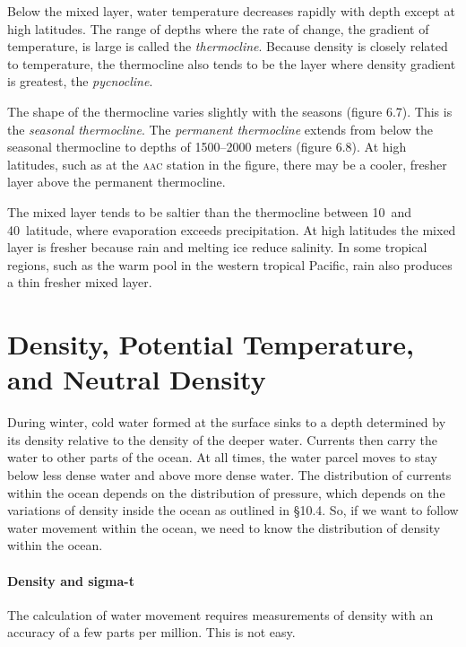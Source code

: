 Below the mixed layer, water temperature decreases rapidly with
depth except at high latitudes. The range of depths where the rate of change, the gradient of
temperature, is large is called the
\textit{thermocline}. Because density is closely related
to temperature, the thermocline also tends to be the layer where density gradient is greatest,
the \textit{pycnocline}.

The shape of the thermocline varies slightly with the seasons (figure 6.7). This is the \textit{seasonal
thermocline}.
 The \textit{permanent thermocline}
extends from below the seasonal thermocline to
depths of 1500--2000 meters (figure 6.8). At high latitudes, such as at the
\textsc{aac} station in the figure, there may be a cooler, fresher layer above the
permanent thermocline.

The mixed layer tends to be saltier than the thermocline between
10\degrees\ and 40\degrees\ latitude, where evaporation exceeds precipitation. At high
latitudes the mixed layer is fresher because rain and melting
ice reduce salinity. In some tropical regions, such as the warm pool in the western tropical
Pacific, rain also produces a thin fresher mixed layer.

\section[Density]{Density, Potential Temperature, and Neutral Density}
During winter, cold water formed at the surface sinks to a depth determined by its
density relative to the density of the deeper water. Currents then carry the
water to other parts of the ocean. At all times, the water parcel moves to stay
below less dense water and above more dense water. The distribution of currents
within the ocean depends on the distribution of pressure, which depends
on the variations of density inside the ocean as outlined in \S10.4. So, if we
want to follow water movement within the ocean, we need to know the distribution
of density within the ocean.

\paragraph{Density and sigma-t}
The calculation of water movement requires
measurements of density with an accuracy of a few parts per
million. This is not easy.

